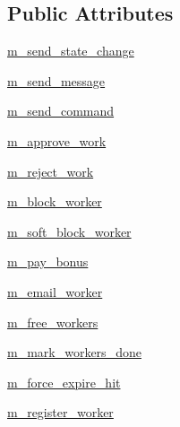 \subsection*{Public Attributes}
\begin{DoxyCompactItemize}
\item 
\hyperlink{classparlai_1_1mturk_1_1core_1_1dev_1_1agents_1_1MTurkAgent_ad1675179d180c0450270e2cb9d195265}{m\+\_\+send\+\_\+state\+\_\+change}
\item 
\hyperlink{classparlai_1_1mturk_1_1core_1_1dev_1_1agents_1_1MTurkAgent_a5d6af1bd07cbb2c414c042ed0ca90854}{m\+\_\+send\+\_\+message}
\item 
\hyperlink{classparlai_1_1mturk_1_1core_1_1dev_1_1agents_1_1MTurkAgent_af45d599a683006e113286d43fb9d2b2f}{m\+\_\+send\+\_\+command}
\item 
\hyperlink{classparlai_1_1mturk_1_1core_1_1dev_1_1agents_1_1MTurkAgent_a920dcb532365407c95f30d8ac6918da6}{m\+\_\+approve\+\_\+work}
\item 
\hyperlink{classparlai_1_1mturk_1_1core_1_1dev_1_1agents_1_1MTurkAgent_a2cc7e453f12d041e54d6e80b077478d3}{m\+\_\+reject\+\_\+work}
\item 
\hyperlink{classparlai_1_1mturk_1_1core_1_1dev_1_1agents_1_1MTurkAgent_a9c11bd1199fab1225dff981b51ab4738}{m\+\_\+block\+\_\+worker}
\item 
\hyperlink{classparlai_1_1mturk_1_1core_1_1dev_1_1agents_1_1MTurkAgent_a3aa04866175e3e28228b2ed6c3cc2f83}{m\+\_\+soft\+\_\+block\+\_\+worker}
\item 
\hyperlink{classparlai_1_1mturk_1_1core_1_1dev_1_1agents_1_1MTurkAgent_a84debd972feaa0a37bf6d2f57251f1aa}{m\+\_\+pay\+\_\+bonus}
\item 
\hyperlink{classparlai_1_1mturk_1_1core_1_1dev_1_1agents_1_1MTurkAgent_a196afdf902ca9437fbffcdd5a184e5a8}{m\+\_\+email\+\_\+worker}
\item 
\hyperlink{classparlai_1_1mturk_1_1core_1_1dev_1_1agents_1_1MTurkAgent_a32c34b4b49fdbb6ba09e0d4abaccb058}{m\+\_\+free\+\_\+workers}
\item 
\hyperlink{classparlai_1_1mturk_1_1core_1_1dev_1_1agents_1_1MTurkAgent_a7f36f8ec0987ce6e526c041b2aaa7955}{m\+\_\+mark\+\_\+workers\+\_\+done}
\item 
\hyperlink{classparlai_1_1mturk_1_1core_1_1dev_1_1agents_1_1MTurkAgent_af1ce87e657baf453d61329fa46a9d733}{m\+\_\+force\+\_\+expire\+\_\+hit}
\item 
\hyperlink{classparlai_1_1mturk_1_1core_1_1dev_1_1agents_1_1MTurkAgent_ad4a1725e68c22a6bad91c46f6c16b572}{m\+\_\+register\+\_\+worker}

\end{DoxyCompactItemize}
